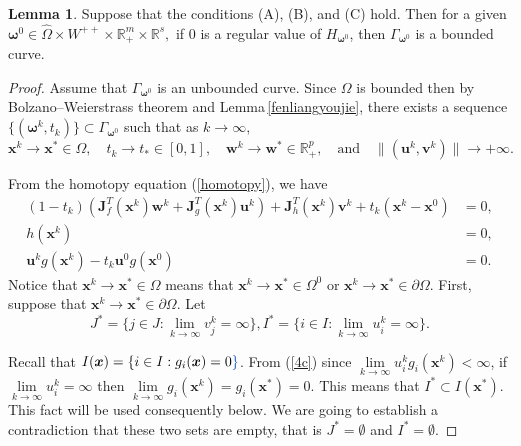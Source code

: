 \documentclass[11pt,pdflatex,sn-mathphys-ay]{sn-jnl}%
\theoremstyle{definition}
\theoremstyle{thmstyleone}%
\theoremstyle{thmstyletwo}%
\newtheorem{lemma}{Lemma}%
\theoremstyle{thmstylethree}%
\newcommand{\add}[1]{\textcolor{revisionblue}{#1}}
\begin{document}
	\begin{lemma}\label{youjie} Suppose that the conditions (A), (B), and (C)
		hold. Then for a given $\bm{\omega}^0\in \hat{\Omega}\times  W^{++} \times
		\mathbb{R}^{m}_{+}\times \mathbb{R}^s,$ if $0$ is a regular value
		of $H_{\bm{\omega}^0}$, then $\Gamma_{\bm{\omega}^0}$ is a bounded curve.
	\end{lemma}
	\vspace{-0.5cm}
	\begin{proof}   Assume that $\Gamma_{\bm{\omega}^0}$ is an unbounded curve. Since $\Omega$ is bounded then by  Bolzano–Weierstrass theorem and \add{Lemma}\,\ref{fenliangyoujie}, there exists a sequence
		$\{(\bm{\omega}^k,t_k)\}\subset \Gamma_{\bm{\omega}^0}$ such that as $k\rightarrow\infty$, 
		\begin{equation*}
			\bm{x}^k\rightarrow \bm{x}^* \in \Omega,\quad t_k\rightarrow t_* \in [0, 1], \quad \textbf{w} ^k\rightarrow \textbf{w}^* \in \mathbb{R}^{p}_{+},\quad
			\text{and} \quad \|(\bm{u}^k,\bm{v}^k)\|\rightarrow +\infty.
		\end{equation*}
		
		\noindent From the homotopy equation (\ref{homotopy}), we have
		\begin{eqnarray}
			(1-t_k)(\textbf{J}^T_ f(\bm{x}^k) \textbf{w}^k +\textbf{J}^T_ g(\bm{x}^k)\bm{u}^k)+\textbf{J}^T_
			h(\bm{x}^k)\bm{v}^k+t_k (\bm{x}^k-\bm{x}^0) & =0, \label{4a}\\
			h(\bm{x}^k) & =0, \label{4b}\\
			\bm{u}^k g(\bm{x}^k)-t_k \bm{u}^0 g(\bm{x}^0) &=0. \label{4c}
		\end{eqnarray}
		\noindent Notice that $\bm{x}^k\rightarrow \bm{x}^* \in  \Omega$ means that $\bm{x}^k\rightarrow \bm{x}^* \in \Omega^0$ or $\bm{x}^k\rightarrow \bm{x}^* \in \partial \Omega$. First, suppose that $\bm{x}^k\rightarrow \bm{x}^* \in \partial \Omega$. Let 
		\begin{equation}
			J^*=\{j\in J : \lim\limits_{k\rightarrow \infty} v_j^k=\infty\}, 
			I^*=\{i\in I : \lim\limits_{k\rightarrow\infty} u_i^k=\infty\}.
		\end{equation}
		
		\noindent Recall that $I(\bm{x}) = \{i\in I :g_i(\bm{x}) =0\add{\}}$. From (\ref{4c}) since  $\lim\limits_{k\rightarrow \infty} u_i^k g_i(\bm{x}^k) < \infty$, if $\lim\limits_{k\rightarrow \infty} u_i^k = \infty$ then $\lim\limits_{k\rightarrow \infty} g_i(\bm{x}^k) =  g_i(\bm{x}^*) = 0$. This means that $ I^*\subset I(\bm{x}^*).$ This fact will be used consequently below.
		We are going to establish a contradiction that these two sets are empty, that is $J^* = \emptyset$ and $I^* = \emptyset$.
		

\end{proof}
\end{document}
